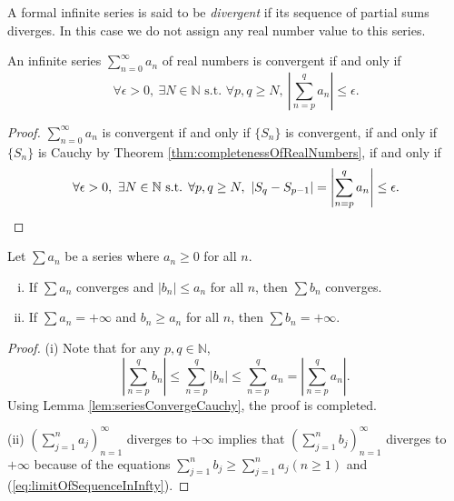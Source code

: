 \begin{defn}
  A formal infinite series is said to be \emph{divergent}
  if its sequence of partial sums diverges.
  In this case we do not assign any real number value to this series.
\end{defn}

\begin{lem}
  \label{lem:seriesConvergeCauchy}
  An infinite series $\sum_{n=0}^{\infty} a_n$ of real numbers
  is convergent if and only if
  \begin{equation}
    \label{eq:seriesConvergeCauchy}
    \forall \epsilon>0,\ \exists N\in \mathbb{N} \text{ s.t. }
    \forall p,q\ge N, \ \left|\sum_{n=p}^q a_n\right| \le \epsilon.
  \end{equation}
\end{lem}
\begin{proof}
  $\sum_{n=0}^{\infty}a_{n}$ is convergent if and only if
  $\{S_{n}\}$ is convergent, if and only if $\{S_{n}\}$ is Cauchy
  by Theorem \ref{thm:completenessOfRealNumbers}, if and only if
  \begin{displaymath}
    \forall \epsilon>0,\ \exists N\in \mathbb{N} \text{ s.t. }
    \forall p,q\ge N, \ |S_{q}-S_{p-1}|
    =\left|\sum_{n=p}^q a_n\right| \le \epsilon. \qedhere
  \end{displaymath}
\end{proof}

\begin{thm}
  \label{thm:comparisonTest}
  Let $\sum a_n$ be a series where $a_n\ge 0$ for all $n$.
  \begin{enumerate}[(i)]\itemsep0em
  \item If $\sum a_n$ converges and $|b_n|\le a_n$ for all $n$,
    then $\sum b_n$ converges.
  \item If $\sum a_n=+\infty$ and $b_n \ge a_n$ for all $n$,
    then \mbox{$\sum b_n=+\infty$}.
  \end{enumerate}
\end{thm}
\begin{proof}
  (i) Note that for any $p,q\in\mathbb{N}$,
  \begin{displaymath}
    \left| \sum_{n=p}^{q}b_{n} \right|
    \le  \sum_{n=p}^{q}|b_{n}| \le \sum_{n=p}^{q}a_{n}
    =\left| \sum_{n=p}^{q}a_{n} \right|.
  \end{displaymath}
  Using Lemma \ref{lem:seriesConvergeCauchy}, the proof is completed.

  (ii) $(\sum_{j=1}^{n}a_{j})_{n=1}^{\infty}$ diverges to $+\infty$
  implies that
  $(\sum_{j=1}^{n}b_{j})_{n=1}^{\infty}$ diverges to $+\infty$
  because of the equations
  $\sum_{j=1}^{n}b_{j}\ge \sum_{j=1}^{n}a_{j}(n\ge 1)$ and
  (\ref{eq:limitOfSequenceInInfty}).
\end{proof}

